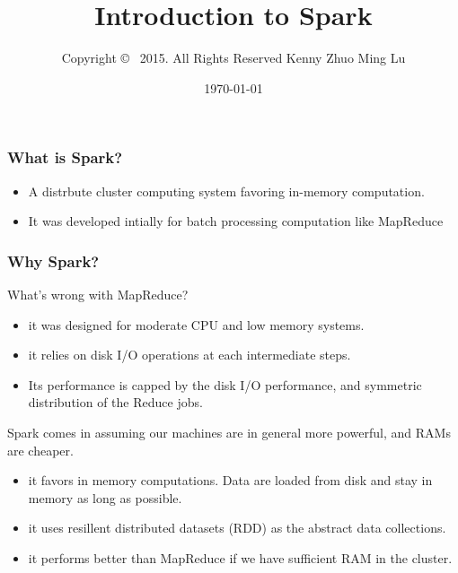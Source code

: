\documentclass{beamer}
\begin{document}
\lstset{language=python}

\title{ Introduction to Spark} 
\author{ \white 
 Copyright \copyright~ 2015. All Rights Reserved
Kenny Zhuo Ming Lu 
}
\date{\today} 


%

\frame{\titlepage} 



\begin{frame}
\frametitle{What is Spark?}
\begin{itemize}
\item A distrbute cluster computing system favoring in-memory computation. 
\item It was developed intially for batch processing computation like MapReduce
\end{itemize}
\end{frame}


\begin{frame}
\frametitle{Why Spark?}
What's wrong with MapReduce?
\begin{itemize}
 \item  it was designed for moderate CPU and low memory systems. 
 \item  it relies on disk I/O operations at each intermediate steps. 
 \item Its performance is capped by the disk I/O performance, and symmetric distribution of the
Reduce jobs.
\end{itemize}
Spark comes in assuming our machines are in general more powerful, and
RAMs are cheaper. 
\begin{itemize}
\item it favors in memory computations. Data are loaded from disk and
  stay in memory as long as possible.
\item it uses resillent distributed datasets (RDD) as the abstract data collections.
\item it performs better than MapReduce if we have sufficient RAM in
  the cluster.
\end{itemize}
\end{frame}
\end{document}
